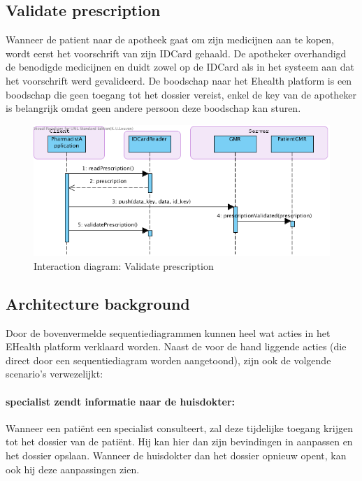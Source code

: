 \documentclass[a4paper,10pt]{article}
\begin{document}
\subsection{Validate prescription}
\label{interaction:validatePrescription}
Wanneer de patient naar de apotheek gaat om zijn medicijnen aan te kopen, wordt eerst het voorschrift van zijn IDCard gehaald. De apotheker overhandigd de benodigde medicijnen en duidt zowel op de IDCard als in het systeem aan dat het voorschrift werd gevalideerd. De boodschap naar het Ehealth platform is een boodschap die geen toegang tot het dossier vereist, enkel de key van de apotheker is belangrijk omdat geen andere persoon deze boodschap kan sturen.

\begin{figure}[!h]
  \includegraphics[width=\textwidth]{../images/validatePrescription.png}
  \caption{Interaction diagram: Validate prescription}
\end{figure}


\subsection{Architecture background}

Door de bovenvermelde sequentiediagrammen kunnen heel wat acties in het EHealth platform verklaard worden. 
Naast de voor de hand liggende acties (die direct door een sequentiediagram worden aangetoond), zijn ook de volgende scenario's verwezelijkt: 
\paragraph{specialist zendt informatie naar de huisdokter:}
Wanneer een patiënt een specialist consulteert, zal deze tijdelijke toegang krijgen tot het dossier van de patiënt. Hij kan hier dan zijn bevindingen in aanpassen en het dossier opslaan. Wanneer de huisdokter dan het dossier opnieuw opent, kan ook hij deze aanpassingen zien. 
\end{document}
